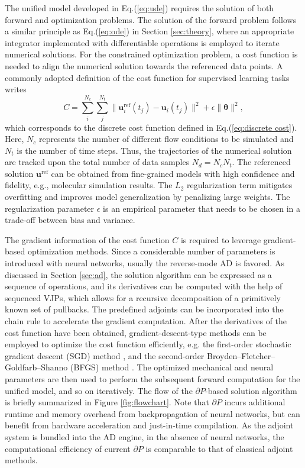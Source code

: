 \documentclass[preprint,3p,12pt,sort&compress]{elsarticle}
\begin{document}
The unified model developed in Eq.(\ref{eq:ude}) requires the solution of both forward and optimization problems.
The solution of the forward problem follows a similar principle as Eq.(\ref{eq:ode}) in Section \ref{sec:theory}, where an appropriate integrator implemented with differentiable operations is employed to iterate numerical solutions.
For the constrained optimization problem, a cost function is needed to align the numerical solution towards the referenced data points.
A commonly adopted definition of the cost function for supervised learning tasks writes
\begin{equation}
    C = \sum_i^{N_c} \sum^{N_{t}}_j \|\mathbf u_i^{\mathrm{ref}}(t_j)-\mathbf u_i(t_j)\|^2 + \epsilon \|\boldsymbol{\theta}\|^2,
\label{eq:cost}
\end{equation}
which corresponds to the discrete cost function defined in Eq.(\ref{eq:discrete cost}).
Here, $N_c$ represents the number of different flow conditions to be simulated and $N_t$ is the number of time steps.
Thus, the trajectories of the numerical solution are tracked upon the total number of data samples $N_{d}=N_c N_t$.
The referenced solution $\mathbf u^{\mathrm{ref}}$ can be obtained from fine-grained models with high confidence and fidelity, e.g., molecular simulation results.
The $L_2$ regularization term mitigates overfitting and improves model generalization by penalizing large weights.
The regularization parameter $\epsilon$ is an empirical parameter that needs to be chosen in a trade-off between bias and variance.

The gradient information of the cost function $C$ is required to leverage gradient-based optimization methods.
Since a considerable number of parameters is introduced with neural networks, usually the reverse-mode AD is favored.
As discussed in Section \ref{sec:ad}, the solution algorithm can be expressed as a sequence of operations, and its derivatives can be computed with the help of sequenced VJPs, which allows for a recursive decomposition of a primitively known set of pullbacks.
The predefined adjoints can be incorporated into the chain rule to accelerate the gradient computation.
After the derivatives of the cost function have been obtained, gradient-descent-type methods can be employed to optimize the cost function efficiently, e.g. the first-order stochastic gradient descent (SGD) method \cite{bottou2010large}, and the second-order Broyden–Fletcher–Goldfarb–Shanno (BFGS) method \cite{liu1989limited}.
The optimized mechanical and neural parameters are then used to perform the subsequent forward computation for the unified model, and so on iteratively.
The flow of the $\partial P$-based solution algorithm is briefly summarized in Figure \ref{fig:flowchart}.
Note that $\partial P$ incurs additional runtime and memory overhead from backpropagation of neural networks, but can benefit from hardware acceleration and just-in-time compilation.
As the adjoint system is bundled into the AD engine, in the absence of neural networks, the computational efficiency of current $\partial P$ is comparable to that of classical adjoint methods.
\end{document}
